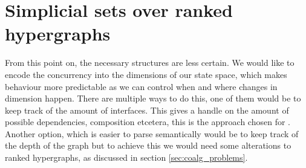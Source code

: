 \documentclass[12pt]{article}
\newtheorem{corollary}[theorem]{Corollary}
\theoremstyle{definition}
\newtheorem{definition}[theorem]{Definition}
\newcommand{\defeq}{\vcentcolon=}
\newcommand{\1}{\mathbbm{1}}
\renewcommand{\L}{\mathcal{L}}
\newcommand{\seq}{;}
\begin{document}



    


\newpage
\section{Simplicial sets over ranked hypergraphs}
From this point on, the necessary structures are less certain. We would like to encode the concurrency into the dimensions of our state space, which makes behaviour more predictable as we can control when and where changes in dimension happen. There are multiple ways to do this, one of them would be to keep track of the amount of interfaces. This gives a handle on the amount of possible dependencies, composition etcetera, this is the approach chosen for . Another option, which is easier to parse semantically would be to keep track of the depth of the graph but to achieve this we would need some alterations to ranked hypergraphs, as discussed in section \ref{sec:coalg_problems}. 
\end{document}
